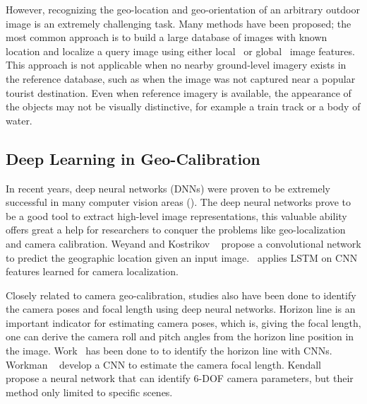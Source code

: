 However, recognizing the geo-location and geo-orientation of an
arbitrary outdoor image is an extremely challenging task.  Many
methods have been proposed; the most common approach is to build a
large database of images with known location and localize a query
image using either local~\cite{li2010location,schindler2008detecting}
or global~\cite{hays2008im2gps,doersch2012what} image features.  This
approach is not applicable when no nearby ground-level imagery exists
in the reference database, such as when the image was not captured
near a popular tourist destination.  Even when reference imagery is
available, the appearance of the objects may not be visually
distinctive, for example a train track or a body of water. 


\subsection{Deep Learning in Geo-Calibration}
In recent years, deep neural networks (DNNs) were proven to be
extremely successful in many computer vision areas (). 
The deep neural networks prove to be a good tool to extract high-level
image representations, this valuable ability offers great a help for
researchers to conquer the problems like geo-localization and camera
calibration.
Weyand and Kostrikov \etal~\cite{planet} propose a convolutional
network to predict the geographic location given an input
image.~\cite{walch2017image} applies LSTM on CNN features learned for
camera localization.

Closely related to camera geo-calibration, studies also have been done
to identify the camera poses and focal length using deep neural
networks.
Horizon line is an important indicator for estimating camera poses,
which is, giving the focal length, one can derive the camera roll and
pitch angles from the horizon line position in the image.
Work~\cite{zhai2016horizon, workman2016horizon, hold2017perceptual}
has been done to to identify the horizon line with CNNs.  Workman
\etal~\cite{workman2015deepfocal} develop a CNN to estimate the camera
focal length. Kendall \etal~\cite{kendall2015convolutional} propose a
neural network that can identify 6-DOF camera parameters, but their
method only limited to specific scenes.


